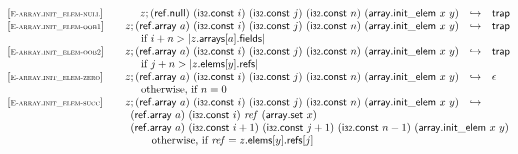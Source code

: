 $$
\begin{array}[t]{@{}lrcl@{}l@{}}
{[\textsc{\scriptsize E{-}array.init\_elem{-}null}]} \quad & z ; (\mathsf{ref{.}null})~(\mathsf{i{\scriptstyle 32}}{.}\mathsf{const}~i)~(\mathsf{i{\scriptstyle 32}}{.}\mathsf{const}~j)~(\mathsf{i{\scriptstyle 32}}{.}\mathsf{const}~n)~(\mathsf{array{.}init\_elem}~x~y) & \hookrightarrow & \mathsf{trap} \\
{[\textsc{\scriptsize E{-}array.init\_elem{-}oob1}]} \quad & z ; (\mathsf{ref{.}array}~a)~(\mathsf{i{\scriptstyle 32}}{.}\mathsf{const}~i)~(\mathsf{i{\scriptstyle 32}}{.}\mathsf{const}~j)~(\mathsf{i{\scriptstyle 32}}{.}\mathsf{const}~n)~(\mathsf{array{.}init\_elem}~x~y) & \hookrightarrow & \mathsf{trap} &  \\
& \multicolumn{4}{@{}l@{}}{\quad
\quad \mbox{if}~ i + n > {|z{.}\mathsf{arrays}{}[a]{.}\mathsf{fields}|}
} \\
{[\textsc{\scriptsize E{-}array.init\_elem{-}oob2}]} \quad & z ; (\mathsf{ref{.}array}~a)~(\mathsf{i{\scriptstyle 32}}{.}\mathsf{const}~i)~(\mathsf{i{\scriptstyle 32}}{.}\mathsf{const}~j)~(\mathsf{i{\scriptstyle 32}}{.}\mathsf{const}~n)~(\mathsf{array{.}init\_elem}~x~y) & \hookrightarrow & \mathsf{trap} &  \\
& \multicolumn{4}{@{}l@{}}{\quad
\quad \mbox{if}~ j + n > {|z{.}\mathsf{elems}{}[y]{.}\mathsf{refs}|}
} \\
{[\textsc{\scriptsize E{-}array.init\_elem{-}zero}]} \quad & z ; (\mathsf{ref{.}array}~a)~(\mathsf{i{\scriptstyle 32}}{.}\mathsf{const}~i)~(\mathsf{i{\scriptstyle 32}}{.}\mathsf{const}~j)~(\mathsf{i{\scriptstyle 32}}{.}\mathsf{const}~n)~(\mathsf{array{.}init\_elem}~x~y) & \hookrightarrow & \epsilon &  \\
& \multicolumn{4}{@{}l@{}}{\quad
\quad \mbox{otherwise, if}~ n = 0
} \\
{[\textsc{\scriptsize E{-}array.init\_elem{-}succ}]} \quad & z ; (\mathsf{ref{.}array}~a)~(\mathsf{i{\scriptstyle 32}}{.}\mathsf{const}~i)~(\mathsf{i{\scriptstyle 32}}{.}\mathsf{const}~j)~(\mathsf{i{\scriptstyle 32}}{.}\mathsf{const}~n)~(\mathsf{array{.}init\_elem}~x~y) & \hookrightarrow & & \\
& \multicolumn{4}{@{}l@{}}{\quad
\begin{array}[t]{@{}l@{}l@{}l@{}}
\begin{array}[t]{@{}l@{}} (\mathsf{ref{.}array}~a)~(\mathsf{i{\scriptstyle 32}}{.}\mathsf{const}~i)~{\mathit{ref}}~(\mathsf{array{.}set}~x) \\
  (\mathsf{ref{.}array}~a)~(\mathsf{i{\scriptstyle 32}}{.}\mathsf{const}~i + 1)~(\mathsf{i{\scriptstyle 32}}{.}\mathsf{const}~j + 1)~(\mathsf{i{\scriptstyle 32}}{.}\mathsf{const}~n - 1)~(\mathsf{array{.}init\_elem}~x~y) \end{array} & & \\
 \multicolumn{3}{@{}l@{}}{\quad
\begin{array}[t]{@{}l@{}}
\quad \mbox{otherwise, if}~ {\mathit{ref}} = z{.}\mathsf{elems}{}[y]{.}\mathsf{refs}{}[j] \\
\end{array}
} \\
\end{array}
} \\
\end{array}
$$

